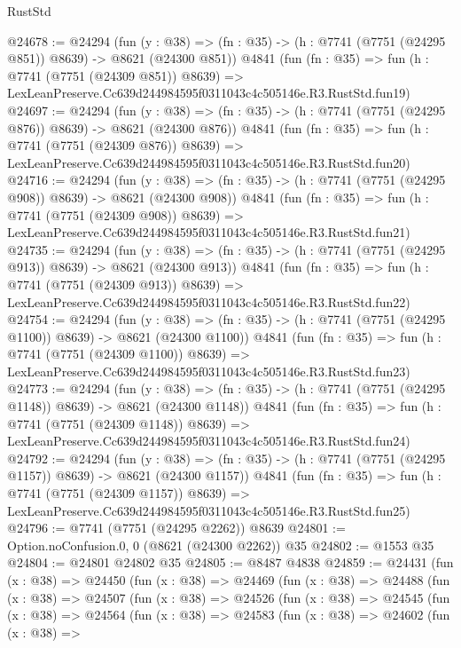 \begin{lexlean}{RustStd}
\begin{coremodule}
@24678 := @24294
    (fun (y : @38) => (fn : @35) -> (h : @7741 (@7751 (@24295 @851)) @8639) -> @8621 (@24300 @851))
    @4841
    (fun (fn : @35) =>
    fun (h : @7741 (@7751 (@24309 @851)) @8639) =>
    LexLeanPreserve.Cc639d244984595f0311043c4c505146e.R3.RustStd.fun19)
@24697 := @24294
    (fun (y : @38) => (fn : @35) -> (h : @7741 (@7751 (@24295 @876)) @8639) -> @8621 (@24300 @876))
    @4841
    (fun (fn : @35) =>
    fun (h : @7741 (@7751 (@24309 @876)) @8639) =>
    LexLeanPreserve.Cc639d244984595f0311043c4c505146e.R3.RustStd.fun20)
@24716 := @24294
    (fun (y : @38) => (fn : @35) -> (h : @7741 (@7751 (@24295 @908)) @8639) -> @8621 (@24300 @908))
    @4841
    (fun (fn : @35) =>
    fun (h : @7741 (@7751 (@24309 @908)) @8639) =>
    LexLeanPreserve.Cc639d244984595f0311043c4c505146e.R3.RustStd.fun21)
@24735 := @24294
    (fun (y : @38) => (fn : @35) -> (h : @7741 (@7751 (@24295 @913)) @8639) -> @8621 (@24300 @913))
    @4841
    (fun (fn : @35) =>
    fun (h : @7741 (@7751 (@24309 @913)) @8639) =>
    LexLeanPreserve.Cc639d244984595f0311043c4c505146e.R3.RustStd.fun22)
@24754 := @24294
    (fun (y : @38) =>
    (fn : @35) -> (h : @7741 (@7751 (@24295 @1100)) @8639) -> @8621 (@24300 @1100))
    @4841
    (fun (fn : @35) =>
    fun (h : @7741 (@7751 (@24309 @1100)) @8639) =>
    LexLeanPreserve.Cc639d244984595f0311043c4c505146e.R3.RustStd.fun23)
@24773 := @24294
    (fun (y : @38) =>
    (fn : @35) -> (h : @7741 (@7751 (@24295 @1148)) @8639) -> @8621 (@24300 @1148))
    @4841
    (fun (fn : @35) =>
    fun (h : @7741 (@7751 (@24309 @1148)) @8639) =>
    LexLeanPreserve.Cc639d244984595f0311043c4c505146e.R3.RustStd.fun24)
@24792 := @24294
    (fun (y : @38) =>
    (fn : @35) -> (h : @7741 (@7751 (@24295 @1157)) @8639) -> @8621 (@24300 @1157))
    @4841
    (fun (fn : @35) =>
    fun (h : @7741 (@7751 (@24309 @1157)) @8639) =>
    LexLeanPreserve.Cc639d244984595f0311043c4c505146e.R3.RustStd.fun25)
@24796 := @7741 (@7751 (@24295 @2262)) @8639
@24801 := Option.noConfusion.{0, 0} (@8621 (@24300 @2262)) @35
@24802 := @1553 @35
@24804 := @24801 @24802 @35
@24805 := @8487 @4838
@24859 := @24431
    (fun (x : @38) =>
    @24450
      (fun (x : @38) =>
      @24469
        (fun (x : @38) =>
        @24488
          (fun (x : @38) =>
          @24507
            (fun (x : @38) =>
            @24526
              (fun (x : @38) =>
              @24545
                (fun (x : @38) =>
                @24564
                  (fun (x : @38) =>
                  @24583
                    (fun (x : @38) =>
                    @24602
                      (fun (x : @38) =>

\end{coremodule}
\end{lexlean}
